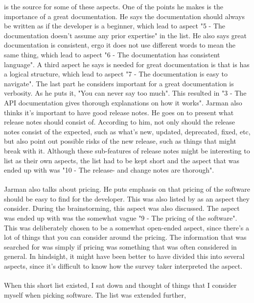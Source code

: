 \documentclass{cslthse-msc}
\begin{document}
    \citet{jarman} is the source for some of these
    aspects. One of the points he makes is the importance of a great documentation.
    He says the documentation should always be written as if the developer is
    a beginner, which lead to aspect "5 - The documentation doesn't assume any prior expertise" in the list.
    He also says great documentation is consistent, ergo it does not use different
    words to mean the same thing, which lead to aspect "6 - The documentation has consistent language".
    A third aspect he says is needed for great documentation is that is has a
    logical structure, which lead to aspect "7 - The documentation is easy to navigate".
    The last part he considers important for a great documentation is verbosity.
    As he puts it, "You can never say too much". This resulted in "3 - The API documentation gives thorough explanations on how it works".
    Jarman also thinks it's important to have good release notes. He goes on
    to present what release notes should consist of. According to him, not
    only should the release notes consist of the expected, such as what's new,
    updated, deprecated, fixed, etc, but also point out possible risks of the new release,
    such as things that might break with it. Although these sub-features of release notes
    might be interesting to list as their own aspects, the list had to be kept short
    and the aspect that was ended up with was "10 - The release- and change notes are thorough".
    \\ \\
    Jarman also talks about pricing. He puts emphasis on that pricing of the software
    should be easy to find for the developer. This was also listed by \cite{everydeveloper} as an aspect they consider. During the brainstorming, this
    aspect was also discussed. The aspect was ended up with was the somewhat vague
    "9 - The pricing of the software". This was deliberately chosen
    to be a somewhat open-ended aspect, since there's a lot of things that you can
    consider around the pricing. The information that was searched for was simply if pricing was something
    that was often considered in general. In hindsight, it might have been better to have
    divided this into several aspects, since it's difficult to know how the
    survey taker interpreted the aspect.
    \\ \\
    When this short list existed, I sat down and thought of things that I
    consider myself when picking software. The list was extended further,
\end{document}
